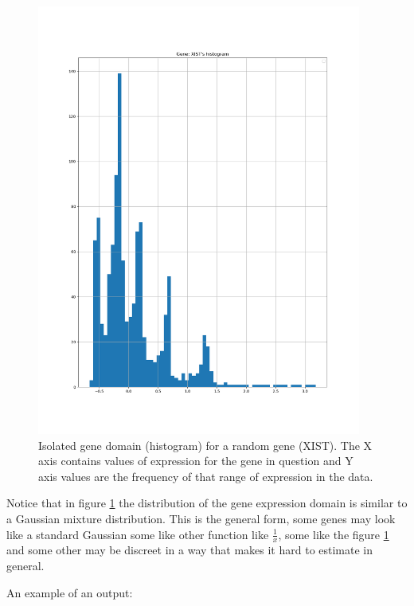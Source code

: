 \documentclass[12pt, a4paper]{article}
\begin{document}
                    \begin{figure}[H]
                        \begin{center}
                            \includegraphics[width=0.95\textwidth]{./outputs/Generator/Histograms/gene_XIST_hist.png}
                        \end{center}
                        \caption{Isolated gene domain (histogram) for a random gene (XIST). The X axis contains values of expression for the gene in question and Y axis values are the frequency of that range of expression in the data.}\label{fig:Dist}
                    \end{figure}

                \begin{multicols}{2}

                Notice that in figure \ref{fig:Dist} the distribution of the gene expression domain is similar to a Gaussian mixture distribution. This is the general form, some genes may look like a standard Gaussian some like other function like $\frac{1}{x}$, some like the figure \ref{fig:Dist} and some other may be discreet in a way that makes it hard to estimate in general.
                \newline

                An example of an output:

                \end{multicols}
\end{document}
